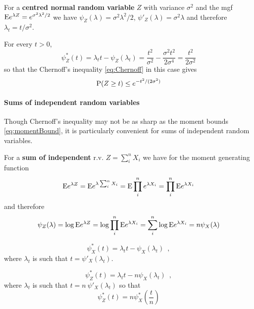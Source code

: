\begin{example}
For a \textbf{centred normal random variable} $Z$ with variance $\sigma^2$ and the mgf
$\mathrm{E} e^{\lambda Z} = e^{\sigma^2 \lambda^2/2}$ we have $\psi_Z(\lambda) = \sigma^2 \lambda^2/2$,
$\psi'_Z(\lambda) = \sigma^2 \lambda$ and therefore $\lambda_t = t/\sigma^2$.

For every $t > 0$, 
\begin{equation}
\psi_Z^*(t) = \lambda_t t - \psi_Z(\lambda_t) = \frac{t^2}{\sigma^2} - \frac{\sigma^2 t^2}{2 \sigma^4} =  \frac{t^2}{2\sigma^2}
\end{equation}
so that the Chernoff's inequality \eqref{eq:Chernoff} in this case gives
\begin{equation}
\mathrm{P}(Z \geq t) \leq e^{- t^2/(2\sigma^2)}
\end{equation}
\end{example}


\paragraph{Sums of independent random variables}
Though Chernoff's inequality may not be as sharp as the moment bounds \eqref{eq:momentBound}, it is particularly convenient for sums of independent random variables.

For a \textbf{sum of independent} r.v. $Z = \sum_i^n X_i$ we have for the moment generating function
\begin{equation}
\mathrm{E} e^{\lambda Z} = \mathrm{E} e^{\lambda \sum_i^n X_i} = \mathrm{E} \prod_i^n e^{\lambda X_i} = \prod_i^n \mathrm{E} e^{\lambda X_i}
\end{equation}
and therefore 
\begin{equation}
\psi_Z(\lambda) = \log \mathrm{E} e^{\lambda Z} = \log \prod_i^n \mathrm{E} e^{\lambda X_i} = \sum_i^n \log \mathrm{E} e^{\lambda X_i} = n \psi_X(\lambda)
\end{equation}

\begin{equation}
\psi_X^*(t) = \lambda_t t - \psi_X(\lambda_t) \enspace ,
\end{equation}
where $\lambda_t$ is such that $t = \psi'_X(\lambda_t)$.

\begin{equation}
\psi_Z^*(t) = \lambda_t t - n \psi_X(\lambda_t) \enspace ,
\end{equation}
where $\lambda_t$ is such that $t = n \ \psi'_X(\lambda_t)$ so that
\begin{equation}
\psi_Z^*(t) = n \psi_X^*\left(\frac{t}{n}\right) 
\end{equation}


